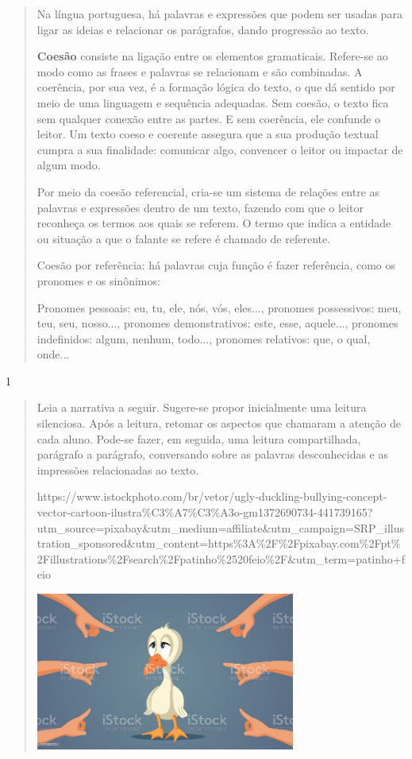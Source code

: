 \begin{escolha}
\begin{quote}
Na língua portuguesa, há palavras e expressões que podem ser usadas para
ligar as ideias e relacionar os parágrafos, dando progressão ao texto.

\textbf{Coesão} consiste na ligação entre os elementos gramaticais.
Refere-se ao modo como as frases e palavras se relacionam e são
combinadas. A coerência, por sua vez, é a formação lógica do texto, o
que dá sentido por meio de uma linguagem e sequência adequadas. Sem
coesão, o texto fica sem qualquer conexão entre as partes. E sem
coerência, ele confunde o leitor. Um texto coeso e coerente assegura que
a sua produção textual cumpra a sua finalidade: comunicar algo,
convencer o leitor ou impactar de algum modo.

Por meio da coesão referencial, cria-se um sistema de relações entre as
palavras e expressões dentro de um texto, fazendo com que o leitor
reconheça os termos aos quais se referem. O termo que indica a entidade
ou situação a que o falante se refere é chamado de referente.

Coesão por referência: há palavras cuja função é fazer referência, como
os pronomes e os sinônimos:

Pronomes pessoais: eu, tu, ele, nós, vós, eles..., pronomes possessivos:
meu, teu, seu, nosso..., pronomes demonstrativos: este, esse, aquele...,
pronomes indefinidos: algum, nenhum, todo..., pronomes relativos: que, o
qual, onde...
\end{quote}


\num{1}

\begin{quote}
Leia a narrativa a seguir. Sugere-se propor inicialmente uma leitura
silenciosa. Após a leitura, retomar os aspectos que chamaram a atenção
de cada aluno. Pode-se fazer, em seguida, uma leitura compartilhada,
parágrafo a parágrafo, conversando sobre as palavras desconhecidas e as
impressões relacionadas ao texto.

https://www.istockphoto.com/br/vetor/ugly-duckling-bullying-concept-vector-cartoon-ilustra\%C3\%A7\%C3\%A3o-gm1372690734-441739165?utm\_source=pixabay\&utm\_medium=affiliate\&utm\_campaign=SRP\_illustration\_sponsored\&utm\_content=https\%3A\%2F\%2Fpixabay.com\%2Fpt\%2Fillustrations\%2Fsearch\%2Fpatinho\%2520feio\%2F\&utm\_term=patinho+feio

\includegraphics[width=3.35140in,height=2.03748in]{media/image36.jpeg}
\end{quote}


\end{escolha}
